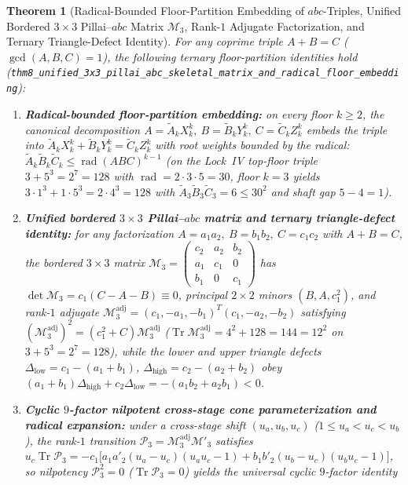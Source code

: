 \documentclass[11pt,a4paper]{article}
\theoremstyle{plain}
\newtheorem{theorem}{Theorem}[section]
\theoremstyle{definition}
\begin{document}
\begin{theorem}[Radical-Bounded Floor-Partition Embedding of $abc$-Triples, Unified Bordered $3\times 3$ Pillai--$abc$ Matrix $\mathcal{M}_3$, Rank-$1$ Adjugate Factorization, and Ternary Triangle-Defect Identity]
\label{thm:main-8}
For any coprime triple $A + B = C$ ($\gcd(A,B,C)=1$), the following ternary floor-partition identities hold (\texttt{thm8\_unified\_3x3\_pillai\_abc\_skeletal\_matrix\_and\_radical\_floor\_embedding}):
\begin{enumerate}[label=\textbf{(\roman*)},leftmargin=*]
\item \textbf{Radical-bounded floor-partition embedding:}
  on every floor $k\ge 2$, the canonical decomposition $A = \widetilde{A}_k X_k^k,\ B = \widetilde{B}_k Y_k^k,\ C = \widetilde{C}_k Z_k^k$ embeds the triple into $\widetilde{A}_k X_k^k + \widetilde{B}_k Y_k^k = \widetilde{C}_k Z_k^k$ with root weights bounded by the radical: $\widetilde{A}_k\widetilde{B}_k\widetilde{C}_k \le \operatorname{rad}(ABC)^{k-1}$ (on the Lock~IV top-floor triple $3 + 5^3 = 2^7 = 128$ with $\operatorname{rad}=2\cdot 3\cdot 5=30$, floor $k=3$ yields $3\cdot 1^3 + 1\cdot 5^3 = 2\cdot 4^3 = 128$ with $\widetilde{A}_3\widetilde{B}_3\widetilde{C}_3 = 6 \le 30^2$ and shaft gap $5 - 4 = 1$).
\item \textbf{Unified bordered $3\times 3$ Pillai--$abc$ matrix and ternary triangle-defect identity:}
  for any factorization $A = a_1 a_2,\ B = b_1 b_2,\ C = c_1 c_2$ with $A + B = C$, the bordered $3\times 3$ matrix $\mathcal{M}_3 = \begin{pmatrix} c_2 & a_2 & b_2 \\ a_1 & c_1 & 0 \\ b_1 & 0 & c_1 \end{pmatrix}$ has $\det\mathcal{M}_3 = c_1(C-A-B) \equiv 0$, principal $2\times 2$ minors $(B, A, c_1^2)$, and rank-$1$ adjugate $\mathcal{M}_3^{\mathrm{adj}} = (c_1,-a_1,-b_1)^T(c_1,-a_2,-b_2)$ satisfying $(\mathcal{M}_3^{\mathrm{adj}})^2 = (c_1^2+C)\mathcal{M}_3^{\mathrm{adj}}$ ($\operatorname{Tr}\mathcal{M}_3^{\mathrm{adj}} = 4^2 + 128 = 144 = 12^2$ on $3 + 5^3 = 2^7 = 128$), while the lower and upper triangle defects $\Delta_{\mathrm{low}} = c_1 - (a_1+b_1)$, $\Delta_{\mathrm{high}} = c_2 - (a_2+b_2)$ obey $(a_1+b_1)\Delta_{\mathrm{high}} + c_2\Delta_{\mathrm{low}} = -(a_1 b_2 + a_2 b_1) < 0$.
\item \textbf{Cyclic $9$-factor nilpotent cross-stage cone parameterization and radical expansion:}
  under a cross-stage shift $(u_a, u_b, u_c)$ ($1\le u_a < u_c < u_b$), the rank-$1$ transition $\mathcal{P}_3 = \mathcal{M}_3^{\mathrm{adj}}\mathcal{M}'_3$ satisfies $u_c\operatorname{Tr}\mathcal{P}_3 = -c_1\bigl[a_1 a'_2(u_a-u_c)(u_a u_c-1) + b_1 b'_2(u_b-u_c)(u_b u_c-1)\bigr]$, so nilpotency $\mathcal{P}_3^2 = 0$ ($\operatorname{Tr}\mathcal{P}_3 = 0$) yields the universal cyclic $9$-factor identity

\end{enumerate}
\end{theorem}
\end{document}

